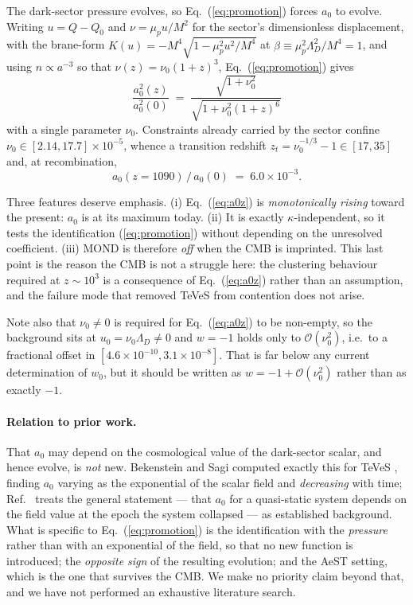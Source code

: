 \documentclass[aps,prd,twocolumn,superscriptaddress,nofootinbib,floatfix]{revtex4-2}
\newcommand{\azero}{a_{0}}
\begin{document}
The dark-sector pressure evolves, so Eq.~(\ref{eq:promotion}) forces $\azero$ to evolve. Writing
$u = Q - Q_{0}$ and $\nu = \mu_{p}u/M^{2}$ for the sector's dimensionless displacement, with the
brane-form $K(u) = -M^{4}\sqrt{1 - \mu_{p}^{2}u^{2}/M^{4}}$ at $\beta \equiv
\mu_{p}^{2}\Lambda_{D}^{2}/M^{4} = 1$, and using $n \propto a^{-3}$ so that $\nu(z) =
\nu_{0}(1+z)^{3}$, Eq.~(\ref{eq:promotion}) gives
\begin{equation}
  \boxed{\;\frac{\azero^{2}(z)}{\azero^{2}(0)}
  \;=\; \frac{\sqrt{1+\nu_{0}^{2}}}{\sqrt{1+\nu_{0}^{2}(1+z)^{6}}}\;}
  \label{eq:a0z}
\end{equation}
with a single parameter $\nu_{0}$. Constraints already carried by the sector confine $\nu_{0}
\in [2.14, 17.7]\times10^{-5}$, whence a transition redshift $z_{t} = \nu_{0}^{-1/3} - 1 \in
[17,35]$ and, at recombination,
\begin{equation}
  \azero(z{=}1090)\,/\,\azero(0) \;=\; 6.0\times10^{-3}.
\end{equation}

Three features deserve emphasis. (i) Eq.~(\ref{eq:a0z}) is \emph{monotonically rising} toward
the present: $\azero$ is at its maximum today. (ii) It is exactly $\kappa$-independent, so it
tests the identification (\ref{eq:promotion}) without depending on the unresolved coefficient.
(iii) MOND is therefore \emph{off} when the CMB is imprinted. This last point is the reason the
CMB is not a struggle here: the clustering behaviour required at $z \sim 10^{3}$ is a consequence
of Eq.~(\ref{eq:a0z}) rather than an assumption, and the failure mode that removed TeVeS from
contention does not arise.

Note also that $\nu_{0} \neq 0$ is required for Eq.~(\ref{eq:a0z}) to be non-empty, so the
background sits at $u_{0} = \nu_{0}\Lambda_{D} \neq 0$ and $w = -1$ holds only to
$\mathcal{O}(\nu_{0}^{2})$, i.e.\ to a fractional offset in $[4.6\times10^{-10},
3.1\times10^{-8}]$. That is far below any current determination of $w_{0}$, but it should be
written as $w = -1 + \mathcal{O}(\nu_{0}^{2})$ rather than as exactly $-1$.

\paragraph*{Relation to prior work.} That $\azero$ may depend on the cosmological value of the
dark-sector scalar, and hence evolve, is \emph{not} new. Bekenstein and Sagi computed exactly
this for TeVeS \cite{BekensteinSagi2008}, finding $\azero$ varying as the exponential of the
scalar field and \emph{decreasing} with time; Ref.~\cite{FamaeyMcGaugh2012} treats the general
statement --- that $\azero$ for a quasi-static system depends on the field value at the epoch the
system collapsed --- as established background. What is specific to Eq.~(\ref{eq:promotion}) is
the identification with the \emph{pressure} rather than with an exponential of the field, so that
no new function is introduced; the \emph{opposite sign} of the resulting evolution; and the AeST
setting, which is the one that survives the CMB. We make no priority claim beyond that, and we
have not performed an exhaustive literature search.
\end{document}
